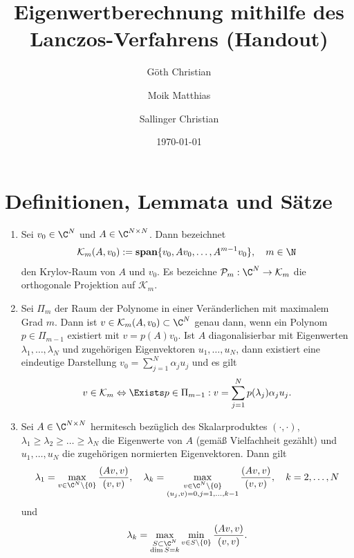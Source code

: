 \documentclass{article}
\begin{document}
\title
{
	Eigenwertberechnung mithilfe des Lanczos-Verfahrens (Handout)
}
\author
{
	Göth Christian
	\and
	Moik Matthias
	\and
	Sallinger Christian
}
\date{\today}
\maketitle


\section{Definitionen, Lemmata und Sätze}

\begin{enumerate}
	\item Sei $v_0 \in \C^{N}$ und $A \in \C^{N \times N}$. Dann bezeichnet
	\begin{align*}
		\mathcal{K}_m(A,v_0) := \textbf{span}\{v_0, Av_0, \dots, A^{m-1}v_0\}, \quad m \in \N
	\end{align*}
	den Krylov-Raum von $A$ und $v_0$. Es bezeichne $\mathcal{P}_m: \C^N \to \mathcal{K}_m$ die orthogonale Projektion auf $\mathcal{K}_m$.
	
	\item 	Sei $\Pi_m$ der Raum der Polynome in einer Veränderlichen mit maximalem Grad $m$. Dann ist $v \in \mathcal{K}_m(A,v_0) \subset \C^N$ genau dann, wenn ein Polynom $p \in \Pi_{m-1}$ existiert mit $v = p(A)v_0$. \newline
	Ist $A$ diagonalisierbar mit Eigenwerten $\lambda_1, \dots, \lambda_N$ und zugehörigen Eigenvektoren $u_1, \dots, u_N$, dann existiert eine eindeutige Darstellung $v_0 = \sum_{j=1}^{N} \alpha_j u_j$ und es gilt
	\begin{align*}
		v \in \mathcal{K}_m \Leftrightarrow \Exists p \in \Pi_{m-1}: v = \sum_{j=1}^{N} p(\lambda_j)\alpha_j u_j.
	\end{align*}

	\item 	Sei $A \in \C^{N \times N}$ hermitesch bezüglich des Skalarproduktes $(\cdot, \cdot)$, $\lambda_1 \geq \lambda_2 \geq \dots \geq \lambda_N$ die Eigenwerte von $A$ (gemäß Vielfachheit gezählt) und $u_1, \dots, u_N$ die zugehörigen normierten Eigenvektoren. Dann gilt
	\begin{align}\label{lambdamax}
		\lambda_1 = \max_{v \in \C^N \setminus \{0\}} \frac{(Av,v)}{(v,v)}, \quad \lambda_k = \max_{\substack{v \in \C^N \setminus \{0\}\\
				(u_j,v) = 0, j= 1,\dots, k-1}} \frac{(Av,v)}{(v,v)}, \quad k= 2, \dots, N
	\end{align}
	und
	\begin{align}\label{lambdamaxmin}
		\lambda_k = \max_{\substack{S \subset \C^N\\
				\dim S = k}} \min_{v \in S \setminus \{0\}} \frac{(Av,v)}{(v,v)}.
	\end{align}


\end{enumerate}
\end{document}
